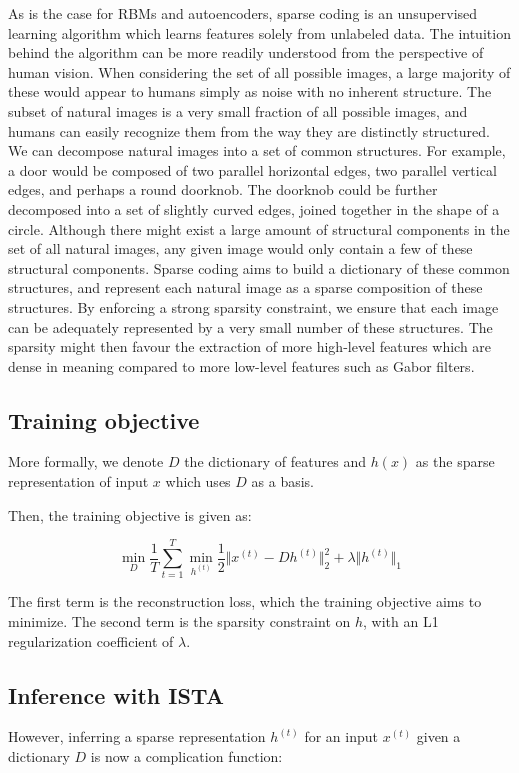 \documentclass{article} %
\begin{document}
As is the case for RBMs and autoencoders, sparse coding is an unsupervised learning algorithm which learns features solely from unlabeled data. The intuition behind the algorithm can be more readily understood from the perspective of human vision. When considering the set of all possible images, a large majority of these would appear to humans simply as noise with no inherent structure. The subset of natural images is a very small fraction of all possible images, and humans can easily recognize them from the way they are distinctly structured. We can decompose natural images into a set of common structures. For example, a door would be composed of two parallel horizontal edges, two parallel vertical edges, and perhaps a round doorknob. The doorknob could be further decomposed into a set of slightly curved edges, joined together in the shape of a circle. Although there might exist a large amount of structural components in the set of all natural images, any given image would only contain a few of these structural components. Sparse coding aims to build a dictionary of these common structures, and represent each natural image as a sparse composition of these structures. By enforcing a strong sparsity constraint, we ensure that each image can be adequately represented by a very small number of these structures. The sparsity might then favour the extraction of more high-level features which are dense in meaning compared to more low-level features such as Gabor filters.

\subsection{Training objective}
More formally, we denote $D$ the dictionary of features and $h(x)$ as the sparse representation of input $x$ which uses $D$ as a basis.

Then, the training objective is given as:

\begin{equation}
\min_{D} \frac{1}{T} \sum_{t=1}^{T} \min_{h^{(t)}} \frac{1}{2} \Vert x^{(t)} - D h^{(t)} \Vert_{2}^{2} + \lambda \Vert h^{(t)} \Vert_{1}
\end{equation}

The first term is the reconstruction loss, which the training objective aims to minimize. The second term is the sparsity constraint on $h$, with an L1 regularization coefficient of $\lambda$.

\subsection{Inference with ISTA}
However, inferring a sparse representation $h^{(t)}$ for an input $x^{(t)}$ given a dictionary $D$ is now a complication function:
\end{document}
